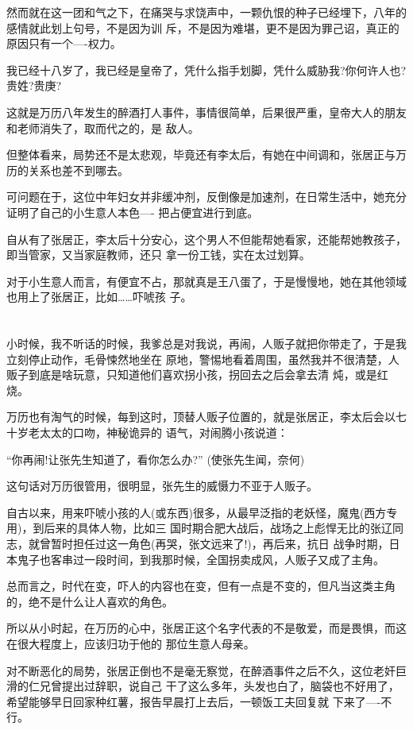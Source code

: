 \documentclass[11pt,a4paper,onecolumn]{article}
\begin{document}
然而就在这一团和气之下，在痛哭与求饶声中，一颗仇恨的种子已经埋下，八年的感情就此划上句号，不是因为训
斥，不是因为难堪，更不是因为罪己诏，真正的原因只有一个----权力。

我已经十八岁了，我已经是皇帝了，凭什么指手划脚，凭什么威胁我?你何许人也?贵姓?贵庚?

这就是万历八年发生的醉酒打人事件，事情很简单，后果很严重，皇帝大人的朋友和老师消失了，取而代之的，是
敌人。

但整体看来，局势还不是太悲观，毕竟还有李太后，有她在中间调和，张居正与万历的关系也差不到哪去。

可问题在于，这位中年妇女并非缓冲剂，反倒像是加速剂，在日常生活中，她充分证明了自己的小生意人本色----
把占便宜进行到底。

自从有了张居正，李太后十分安心，这个男人不但能帮她看家，还能帮她教孩子，即当管家，又当家庭教师，还只
拿一份工钱，实在太过划算。

对于小生意人而言，有便宜不占，那就真是王八蛋了，于是慢慢地，她在其他领域也用上了张居正，比如……吓唬孩
子。

\section[\thesection]{}

小时候，我不听话的时候，我爹总是对我说，再闹，人贩子就把你带走了，于是我立刻停止动作，毛骨悚然地坐在
原地，警惕地看着周围，虽然我并不很清楚，人贩子到底是啥玩意，只知道他们喜欢拐小孩，拐回去之后会拿去清
炖，或是红烧。

万历也有淘气的时候，每到这时，顶替人贩子位置的，就是张居正，李太后会以七十岁老太太的口吻，神秘诡异的
语气，对闹腾小孩说道：

``你再闹!让张先生知道了，看你怎么办?'' (使张先生闻，奈何)

这句话对万历很管用，很明显，张先生的威慑力不亚于人贩子。

自古以来，用来吓唬小孩的人(或东西)很多，从最早泛指的老妖怪，魔鬼(西方专用)，到后来的具体人物，比如三
国时期合肥大战后，战场之上彪悍无比的张辽同志，就曾暂时担任过这一角色(再哭，张文远来了!)，再后来，抗日
战争时期，日本鬼子也客串过一段时间，到我那时候，全国拐卖成风，人贩子又成了主角。

总而言之，时代在变，吓人的内容也在变，但有一点是不变的，但凡当这类主角的，绝不是什么让人喜欢的角色。

所以从小时起，在万历的心中，张居正这个名字代表的不是敬爱，而是畏惧，而这在很大程度上，应该归功于他的
那位生意人母亲。

对不断恶化的局势，张居正倒也不是毫无察觉，在醉酒事件之后不久，这位老奸巨滑的仁兄曾提出过辞职，说自己
干了这么多年，头发也白了，脑袋也不好用了，希望能够早日回家种红薯，报告早晨打上去后，一顿饭工夫回复就
下来了----不行。
\end{document}
